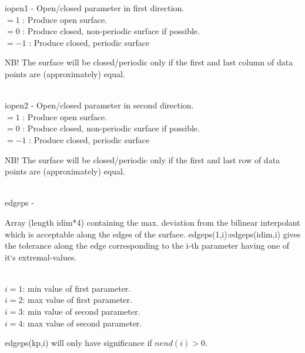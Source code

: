         \>\>   {\fov iopen1}\> - \> Open/closed parameter in first direction.\\
          \>\>\>\>  $= 1$  : Produce open surface.\\
          \>\>\>\>  $= 0$ : Produce closed, non-periodic surface if possible.\\
          \>\>\>\>  $= -1$ : Produce closed, periodic surface\\
        \>\>\>\>  \begin{minipg2}
                  NB! The surface will be closed/periodic only if the first 
                      and last column of data points are (approximately) equal.
                               \end{minipg2}\\[0.8ex]
        \>\>   {\fov iopen2}\> - \> Open/closed parameter in second direction.\\
          \>\>\>\>  $= 1$  : Produce open surface.\\
          \>\>\>\>  $= 0$ : Produce closed, non-periodic surface if possible.\\
          \>\>\>\>  $= -1$ : Produce closed, periodic surface\\
        \>\>\>\>  \begin{minipg2}
                  NB! The surface will be closed/periodic only if the first 
                      and last row of data points are (approximately) equal.
                               \end{minipg2}\\[0.8ex]
        \>\>    {\fov edgeps}\> - \>  \begin{minipg2}
                     Array (length idim*4) containing the max. deviation from
                  the bilinear interpolant which is acceptable along the
                  edges of the surface.
                  edgeps(1,i):edgeps(idim,i) gives the tolerance along
                  the edge corresponding to the i-th parameter having
                  one of it`s extremal-values.
                     \end{minipg2}\\[0.8ex]
          \>\>\>\> $i=1$: min value of first parameter.\\ 
          \>\>\>\> $i=2$: max value of first parameter.\\
          \>\>\>\> $i=3$: min value of second parameter.\\
          \>\>\>\> $i=4$: max value of second parameter.\\
          \>\>\>\>  \begin{minipg2}
                  edgeps(kp,i) will only have significance if $nend(i)>0$.
                               \end{minipg2}\\[0.8ex]

